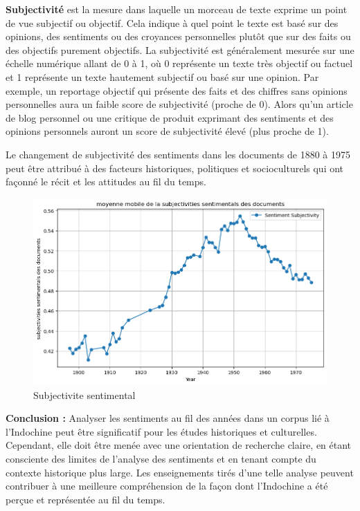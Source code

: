 \textbf{Subjectivité} est la mesure dans laquelle un morceau de texte exprime un point de vue subjectif ou objectif. Cela indique à quel point le texte est basé sur des opinions, des sentiments ou des croyances personnelles plutôt que sur des faits ou des objectifs purement objectifs. La subjectivité est généralement mesurée sur une échelle numérique allant de 0 à 1, où 0 représente un texte très objectif ou factuel et 1 représente un texte hautement subjectif ou basé sur une opinion. Par exemple, un reportage objectif qui présente des faits et des chiffres sans opinions personnelles aura un faible score de subjectivité (proche de 0). Alors qu'un article de blog personnel ou une critique de produit exprimant des sentiments et des opinions personnels auront un score de subjectivité élevé (plus proche de 1).

Le changement de subjectivité des sentiments dans les documents de 1880 à 1975 peut être attribué à des facteurs historiques, politiques et socioculturels qui ont façonné le récit et les attitudes au fil du temps.

\begin{figure}[!ht]
    \centering
    \includegraphics[width=12cm]{img/2.9.subjectivity_sentiment.png}
    \caption{Subjectivite sentimental}
    \label{fig:subject_senti}
\end{figure}

\textbf{Conclusion : }Analyser les sentiments au fil des années dans un corpus lié à l’Indochine peut être significatif pour les études historiques et culturelles. Cependant, elle doit être menée avec une orientation de recherche claire, en étant consciente des limites de l’analyse des sentiments et en tenant compte du contexte historique plus large. Les enseignements tirés d’une telle analyse peuvent contribuer à une meilleure compréhension de la façon dont l’Indochine a été perçue et représentée au fil du temps. 

